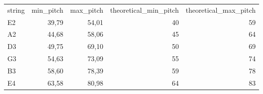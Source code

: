 \begin{tabular}{lrrrr}
string & min_pitch & max_pitch & theoretical_min_pitch & theoretical_max_pitch \\
E2 & 39,79 & 54,01 & 40 & 59 \\
A2 & 44,68 & 58,06 & 45 & 64 \\
D3 & 49,75 & 69,10 & 50 & 69 \\
G3 & 54,63 & 73,09 & 55 & 74 \\
B3 & 58,60 & 78,39 & 59 & 78 \\
E4 & 63,58 & 80,98 & 64 & 83 \\
\end{tabular}
